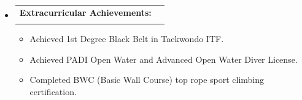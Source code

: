 \documentclass[letterpaper,11pt]{article}
\makeatletter
\newcommand{\resumeItem}[1]{
  \item\small{
    {#1 \vspace{-2pt}}
  }
}
\newcommand{\resumeSubheading}[4]{
  \vspace{-2pt}\item
    \begin{tabular*}{0.97\textwidth}[t]{l@{\extracolsep{\fill}}r}
      \textbf{#1} & #2 \\
      \textit{\small#3} & \textit{\small #4} \\
    \end{tabular*}\vspace{-7pt}
}
\newcommand{\resumeSubHeadingListStart}{\begin{itemize}[leftmargin=0.15in, label={}]}
\newcommand{\resumeSubHeadingListEnd}{\end{itemize}}
\newcommand{\resumeItemListStart}{\begin{itemize}}
\newcommand{\resumeItemListEnd}{\end{itemize}\vspace{-8pt}}
\makeatother
\begin{document}
    \resumeSubHeadingListStart
    \vspace{-10pt}
      \resumeSubheading
      {Extracurricular Achievements:}{}
      {}{}
      \resumeItemListStart
      \vspace{-5mm}
        \resumeItem{Achieved 1st Degree Black Belt in Taekwondo ITF.}
        \resumeItem{Achieved PADI Open Water and Advanced Open Water Diver License.}
        \resumeItem{Completed BWC (Basic Wall Course) top rope sport climbing certification.}
      \resumeItemListEnd
    \resumeSubHeadingListEnd
\end{document}
